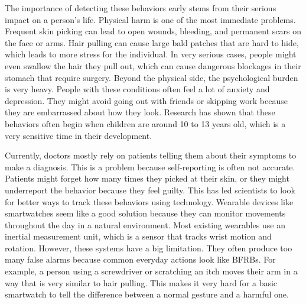 \documentclass[conference]{IEEEtran}
\begin{document}
The importance of detecting these behaviors early stems from their serious impact on a person's life. Physical harm is one of the most immediate problems. Frequent skin picking can lead to open wounds, bleeding, and permanent scars on the face or arms.\cite{alhussain2026prevalence} Hair pulling can cause large bald patches that are hard to hide, which leads to more stress for the individual.\cite{alhussain2026prevalence} In very serious cases, people might even swallow the hair they pull out, which can cause dangerous blockages in their stomach that require surgery.\cite{alhussain2026prevalence} Beyond the physical side, the psychological burden is very heavy. People with these conditions often feel a lot of anxiety and depression.\cite{alhussain2026prevalence} They might avoid going out with friends or skipping work because they are embarrassed about how they look.\cite{searle2025virtual} Research has shown that these behaviors often begin when children are around 10 to 13 years old, which is a very sensitive time in their development.\cite{searle2025virtual}


Currently, doctors mostly rely on patients telling them about their symptoms to make a diagnosis. This is a problem because self-reporting is often not accurate.\cite{zhang2025detection} Patients might forget how many times they picked at their skin, or they might underreport the behavior because they feel guilty.\cite{zhang2025detection} This has led scientists to look for better ways to track these behaviors using technology. Wearable devices like smartwatches seem like a good solution because they can monitor movements throughout the day in a natural environment.\cite{zhang2025detection} Most existing wearables use an inertial measurement unit, which is a sensor that tracks wrist motion and rotation.\cite{zhang2025detection} However, these systems have a big limitation. They often produce too many false alarms because common everyday actions look like BFRBs.\cite{roboteye2025} For example, a person using a screwdriver or scratching an itch moves their arm in a way that is very similar to hair pulling.\cite{roboteye2025} This makes it very hard for a basic smartwatch to tell the difference between a normal gesture and a harmful one.\cite{zhang2025detection}
\end{document}
